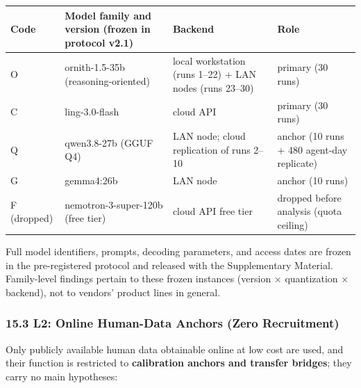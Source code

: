 \documentclass[
  11pt]{article}
\begin{document}
\begin{longtable}[]{@{}
  >{\raggedright\arraybackslash}p{}
  >{\raggedright\arraybackslash}p{}
  >{\raggedright\arraybackslash}p{}
  >{\raggedright\arraybackslash}p{}@{}}
\toprule\noalign{}
\begin{minipage}[b]{\linewidth}\raggedright
Code
\end{minipage} & \begin{minipage}[b]{\linewidth}\raggedright
Model family and version (frozen in protocol v2.1)
\end{minipage} & \begin{minipage}[b]{\linewidth}\raggedright
Backend
\end{minipage} & \begin{minipage}[b]{\linewidth}\raggedright
Role
\end{minipage} \\
\midrule\noalign{}
\endhead
\bottomrule\noalign{}
\endlastfoot
O & ornith-1.5-35b (reasoning-oriented) & local workstation (runs 1--22)
+ LAN nodes (runs 23--30) & primary (30 runs) \\
C & ling-3.0-flash & cloud API & primary (30 runs) \\
Q & qwen3.8-27b (GGUF Q4) & LAN node; cloud replication of runs 2--10 &
anchor (10 runs + 480 agent-day replicate) \\
G & gemma4:26b & LAN node & anchor (10 runs) \\
F (dropped) & nemotron-3-super-120b (free tier) & cloud API free tier &
dropped before analysis (quota ceiling) \\
\end{longtable}

Full model identifiers, prompts, decoding parameters, and access dates
are frozen in the pre-registered protocol and released with the
Supplementary Material. Family-level findings pertain to these frozen
instances (version × quantization × backend), not to vendors' product
lines in general.

\subsubsection{15.3 L2: Online Human-Data Anchors (Zero
Recruitment)}\label{l2-online-human-data-anchors-zero-recruitment}

Only publicly available human data obtainable online at low cost are
used, and their function is restricted to \textbf{calibration anchors
and transfer bridges}; they carry no main hypotheses:
\end{document}
